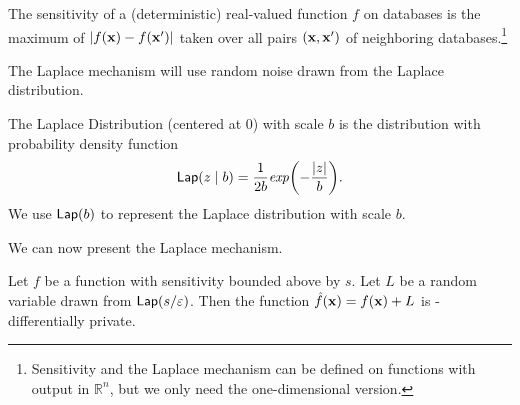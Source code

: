 \begin{definition}[Sensitivity] \label{def:sensitivity}
The sensitivity of a (deterministic) real-valued function $f$ on databases is the maximum of  $\lvert f(\mathbf{x}) - f(\mathbf{x}') \rvert$ taken over all pairs $(\mathbf{x}, \mathbf{x}')$ of neighboring databases.\footnote{Sensitivity and the Laplace mechanism can be defined on functions with output in $\mathbb{R}^n$, but we only need the one-dimensional version.}
\end{definition}

The Laplace mechanism will use random noise drawn from the Laplace distribution.

\begin{definition} \label{def:laplacedist}
The Laplace Distribution (centered at 0) with scale $b$ is the distribution with probability density function
\begin{equation*}
{\sf Lap}(z\mid b) = \frac{1}{2b}\text{\emph{exp}}\bigg({-\frac{\lvert z \rvert}{b}}\bigg).
\end{equation*}
We use ${\sf Lap}(b)$ to represent the Laplace distribution with scale $b$.
\end{definition}

We can now present the Laplace mechanism.

\begin{theorem} \label{thm:lapmechanism}
Let $f$ be a function with sensitivity bounded above by $s$. Let $L$ be a random variable drawn from ${\sf Lap}(s/\varepsilon)$. Then the function $\hat{f}(\mathbf{x}) = f(\mathbf{x}) + L$ is \eps-differentially private. 
\end{theorem}